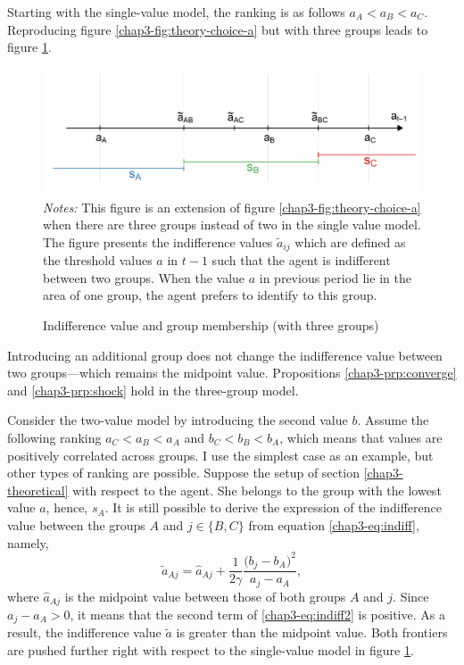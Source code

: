 Starting with the single-value model, the ranking is as follows $a_A < a_B < a_C$. Reproducing figure \ref{chap3-fig:theory-choice-a} but with three groups leads to figure \ref{chap3-fig:theory-choice3-a}.
\begin{figure}[!ht]
    \centering
    \caption{Indifference value and group membership (with three groups)}
    \label{chap3-fig:theory-choice3-a}
    \includegraphics[width=.8\linewidth]{chap3/graphic/theory-choice3-a.png}
	\vspace{-3em}
	\justify\singlespacing\footnotesize{\textit{Notes:} This figure is an extension of figure \ref{chap3-fig:theory-choice-a} when there are three groups instead of two in the single value model. The figure presents the indifference values $\widetilde{a}_{ij}$ which are defined as the threshold values $a$ in $t-1$ such that the agent is indifferent between two groups. When the value $a$ in previous period lie in the area of one group, the agent prefers to identify to this group.}
\end{figure}
Introducing an additional group does not change the indifference value between two groups---which remains the midpoint value.
Propositions \ref{chap3-prp:converge} and \ref{chap3-prp:shock} hold in the three-group model.

Consider the two-value model by introducing the second value $b$. Assume the following ranking $a_C < a_B < a_A$ and $b_C < b_B < b_A$, which means that values are positively correlated across groups. I use the simplest case as an example, but other types of ranking are possible. Suppose the setup of section \ref{chap3-theoretical} with respect to the agent. She belongs to the group with the lowest value $a$, hence, $s_A$. It is still possible to derive the expression of the indifference value between the groups $A$ and $j\in\{B,C\}$ from equation \eqref{chap3-eq:indiff}, namely,
\begin{equation}\label{chap3-eq:indiff2}
    \widetilde{a}_{Aj} = \widehat{a}_{Aj} + \frac{1}{2\gamma}\frac{\big(b_j-b_A\big)^2}{a_j-a_A},
\end{equation}
where $\widehat{a}_{Aj}$ is the midpoint value between those of both groups $A$ and $j$. Since $a_j-a_A > 0$, it means that the second term of \eqref{chap3-eq:indiff2} is positive. As a result, the indifference value $\widetilde{a}$ is greater than the midpoint value. Both frontiers are pushed further right with respect to the single-value model in figure \ref{chap3-fig:theory-choice3-a}.

